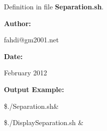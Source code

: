 \documentclass{article}
\begin{document}
\vspace{1pt}
Definition in file \textbf{Separation.sh}.

\vspace{4pt}
\textbf{Author:}

\vspace{4pt}
\leftskip=18pt
fahdi@gm2001.net 

\vspace{4pt}
\leftskip=0pt
\textbf{Date:}

\vspace{4pt}
\leftskip=18pt
February 2012 

\vspace{16pt}
\leftskip=0pt
\textbf{Output Example:}

\vspace{4pt}
\$./Separation.sh\&

\vspace{4pt}
\$./DisplaySeparation.sh \&
\end{document}
